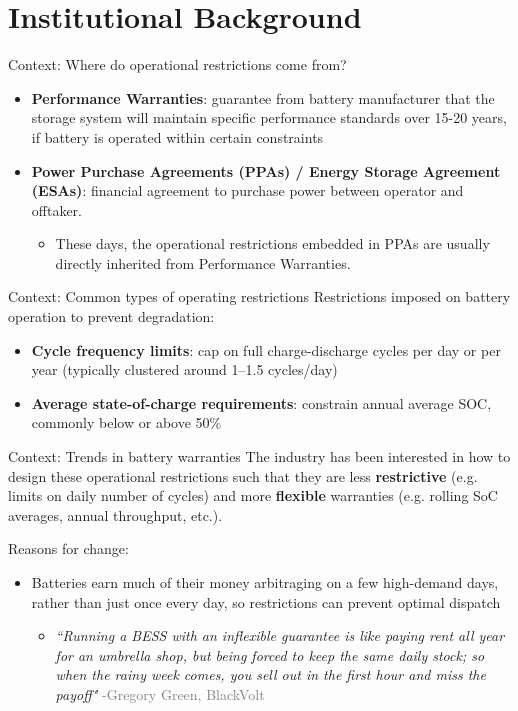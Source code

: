 \documentclass[aspectratio=169]{beamer}
\begin{document}
\section{Institutional Background}

\begin{frame}{Context: Where do operational restrictions come from?}
\begin{itemize}
    \item \textbf{Performance Warranties}: guarantee from battery manufacturer that the storage system will maintain specific performance standards over 15-20 years, if battery is operated within certain constraints
    \item \textbf{Power Purchase Agreements (PPAs) / Energy Storage Agreement (ESAs)}: financial agreement to purchase power between operator and offtaker. 
    \begin{itemize}
        \item These days, the operational restrictions embedded in PPAs are usually directly inherited from Performance Warranties.
    \end{itemize}
\end{itemize}
\end{frame}



\begin{frame}{Context: Common types of operating restrictions}
Restrictions imposed on battery operation to prevent degradation:
\begin{itemize}
    \item \textbf{Cycle frequency limits}: cap on full charge-discharge cycles per day or per year (typically clustered around 1--1.5 cycles/day)
    \item \textbf{Average state-of-charge requirements}: constrain annual average SOC, commonly below or above 50\%
\end{itemize}
\end{frame}

\begin{frame}{Context: Trends in battery warranties}
The industry has been interested in how to design these operational restrictions such that they are less \textbf{restrictive}  (e.g. limits on daily number of cycles) and more \textbf{flexible} warranties (e.g. rolling SoC averages, annual throughput, etc.).

\vspace{0.3cm}
Reasons for change:
\begin{itemize}
    \item Batteries earn much of their money arbitraging on a few high-demand days, rather than just once every day, so restrictions can prevent optimal dispatch
    \begin{itemize}
        \item \textit{``Running a BESS with an inflexible guarantee is like paying rent all year for an umbrella shop, but being forced to keep the same daily stock; so when the rainy week comes, you sell out in the first hour and miss the payoff"} \textcolor{gray}{-Gregory Green, BlackVolt}
    \end{itemize}
\end{itemize}
\end{frame}
\end{document}
